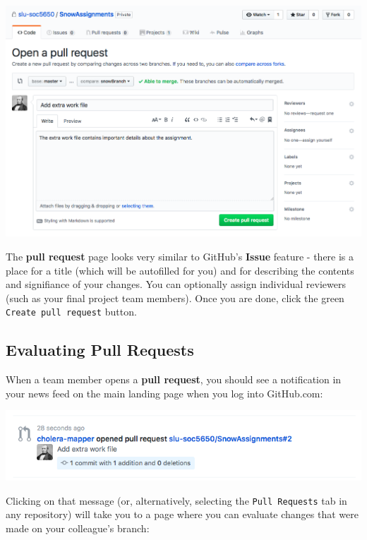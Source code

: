 \documentclass[]{book}
\theoremstyle{definition}
\theoremstyle{definition}
\theoremstyle{definition}
\theoremstyle{remark}
\begin{document}
\includegraphics[width=1\linewidth]{images/branch5}

The \textbf{pull request} page looks very similar to GitHub's
\textbf{Issue} feature - there is a place for a title (which will be
autofilled for you) and for describing the contents and signifiance of
your changes. You can optionally assign individual reviewers (such as
your final project team members). Once you are done, click the green
\texttt{Create\ pull\ request} button.

\subsection{Evaluating Pull Requests}\label{evaluating-pull-requests}

When a team member opens a \textbf{pull request}, you should see a
notification in your news feed on the main landing page when you log
into GitHub.com:

\includegraphics[width=1\linewidth]{images/branch6}

Clicking on that message (or, alternatively, selecting the
\texttt{Pull\ Requests} tab in any repository) will take you to a page
where you can evaluate changes that were made on your colleague's
branch:
\end{document}

